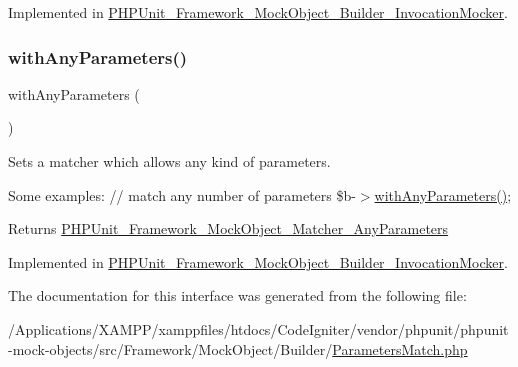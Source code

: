 Implemented in \mbox{\hyperlink{class_p_h_p_unit___framework___mock_object___builder___invocation_mocker_a9197873aa58b8efb8b5570613a05632b}{P\+H\+P\+Unit\+\_\+\+Framework\+\_\+\+Mock\+Object\+\_\+\+Builder\+\_\+\+Invocation\+Mocker}}.

\mbox{\label{interface_p_h_p_unit___framework___mock_object___builder___parameters_match_a9d778819e7c191d54326bf56d1910d7c}} 
\subsubsection{\texorpdfstring{with\+Any\+Parameters()}{withAnyParameters()}}
{\footnotesize\ttfamily with\+Any\+Parameters (\begin{DoxyParamCaption}{ }\end{DoxyParamCaption})}

Sets a matcher which allows any kind of parameters.

Some examples\+: {\ttfamily  // match any number of parameters \$b-\/$>$\mbox{\hyperlink{interface_p_h_p_unit___framework___mock_object___builder___parameters_match_a9d778819e7c191d54326bf56d1910d7c}{with\+Any\+Parameters()}}; }

\begin{DoxyReturn}{Returns}
\mbox{\hyperlink{class_p_h_p_unit___framework___mock_object___matcher___any_parameters}{P\+H\+P\+Unit\+\_\+\+Framework\+\_\+\+Mock\+Object\+\_\+\+Matcher\+\_\+\+Any\+Parameters}} 
\end{DoxyReturn}


Implemented in \mbox{\hyperlink{class_p_h_p_unit___framework___mock_object___builder___invocation_mocker_a9d778819e7c191d54326bf56d1910d7c}{P\+H\+P\+Unit\+\_\+\+Framework\+\_\+\+Mock\+Object\+\_\+\+Builder\+\_\+\+Invocation\+Mocker}}.



The documentation for this interface was generated from the following file\+:\begin{DoxyCompactItemize}
\item 
/\+Applications/\+X\+A\+M\+P\+P/xamppfiles/htdocs/\+Code\+Igniter/vendor/phpunit/phpunit-\/mock-\/objects/src/\+Framework/\+Mock\+Object/\+Builder/\mbox{\hyperlink{_parameters_match_8php}{Parameters\+Match.\+php}}\end{DoxyCompactItemize}

